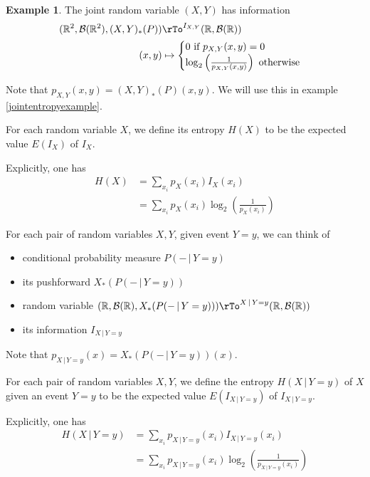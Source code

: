 \documentclass[11pt]{amsart}
\theoremstyle{definition}
\newtheorem{example}[theorem]{Example}
\begin{document}
\begin{example}\label{jointinformation} The joint random variable $(X,Y)$ has information
\begin{align*}
(\mathbb{R}^2, \mathcal{B}(\mathbb{R}^2), (X,Y)_*(P)) & \rTo^{I_{X,Y}} (\mathbb{R}, \mathcal{B}(\mathbb{R})) \\
(x, y) & \mapsto \begin{cases} 0 \text{ if } p_{X,Y}(x, y) = 0 \\ \log_2 \left( \frac{1}{p_{X,Y}(x, y)} \right) \text{ otherwise} \end{cases}
\end{align*}

Note that $p_{X,Y}(x, y) = (X,Y)_*(P)(x, y)$. We will use this in example \ref{jointentropyexample}.
\end{example}

\dfn For each random variable $X$, we define its entropy $H(X)$ to be the expected value $E(I_X)$ of $I_X$.

Explicitly, one has
\begin{align*}
H(X) & = \sum\limits_{x_i} p_X(x_i)I_X(x_i) \\
 & = \sum\limits_{x_i} p_X(x_i) \log_2 \left(\frac{1}{p_X(x_i)} \right)
\end{align*}

For each pair of random variables $X, Y$, given event $Y = y$, we can think of
\begin{itemize}
\item conditional probability measure $P(- \,|\, Y = y)$
\item its pushforward $X_*(P(- \,|\, Y = y))$
\item random variable $(\mathbb{R}, \mathcal{B}(\mathbb{R}), X_*(P(- \,|\, Y = y))) \rTo^{X \,|\, Y = y} (\mathbb{R}, \mathcal{B}(\mathbb{R}))$
\item its information $I_{X \,|\, Y = y}$
\end{itemize}

Note that $p_{X \,|\, Y = y}(x) = X_*(P(- \,|\, Y = y))(x)$.

\dfn For each pair of random variables $X,Y$, we define the entropy $H(X \,|\, Y = y)$ of $X$ given an event $Y = y$ to be the expected value $E(I_{X \,|\, Y = y})$ of $I_{X \,|\, Y = y}$.

Explicitly, one has
\begin{align*}
H(X \,|\, Y = y) & = \sum\limits_{x_i} p_{X \,|\, Y = y}(x_i) I_{X \,|\, Y = y}(x_i) \\
 & = \sum\limits_{x_i} p_{X \,|\, Y = y}(x_i) \log_2 \left( \frac{1}{p_{X \,|\, Y = y}(x_i)} \right)
\end{align*}
\end{document}

